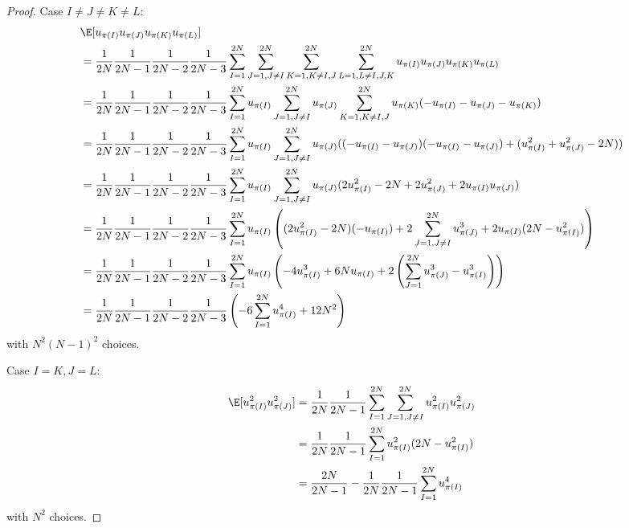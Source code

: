 \begin{proof}
  Case $I \neq J \neq K \neq L$: 
  \begin{align*}
    &\E[u_{\pi(I)} u_{\pi(J)} u_{\pi(K)} u_{\pi(L)}] \\
    &= \frac{1}{2N}\frac{1}{2N-1}\frac{1}{2N-2}\frac{1}{2N-3} 
    \sum_{I=1}^{2N} \sum_{J=1, J\neq I}^{2N} \sum_{K=1, K \neq I,J}^{2N} \sum_{L=1, L \neq I,J,K}^{2N} 
    u_{\pi(I)} u_{\pi(J)} u_{\pi(K)} u_{\pi(L)} \\
    &= \frac{1}{2N}\frac{1}{2N-1}\frac{1}{2N-2}\frac{1}{2N-3} 
    \sum_{I=1}^{2N} u_{\pi(I)} \sum_{J=1, J\neq I}^{2N} u_{\pi(J)} \sum_{K=1, K \neq
      I,J}^{2N} u_{\pi(K)} (-u_{\pi(I)}-u_{\pi(J)}-u_{\pi(K)}) \\
    &= \frac{1}{2N}\frac{1}{2N-1}\frac{1}{2N-2}\frac{1}{2N-3} 
    \sum_{I=1}^{2N} u_{\pi(I)} \sum_{J=1, J\neq I}^{2N} u_{\pi(J)} 
    ((-u_{\pi(I)}-u_{\pi(J)})(-u_{\pi(I)}-u_{\pi(J)})+(u_{\pi(I)}^2+u_{\pi(J)}^2-2N)) \\
    &= \frac{1}{2N}\frac{1}{2N-1}\frac{1}{2N-2}\frac{1}{2N-3} 
    \sum_{I=1}^{2N} u_{\pi(I)} \sum_{J=1, J\neq I}^{2N} u_{\pi(J)} 
    (2u_{\pi(I)}^2-2N+2u_{\pi(J)}^2+2u_{\pi(I)}u_{\pi(J)}) \\
    &= \frac{1}{2N}\frac{1}{2N-1}\frac{1}{2N-2}\frac{1}{2N-3} 
    \sum_{I=1}^{2N} u_{\pi(I)} \left ( 
      (2u_{\pi(I)}^2-2N)(-u_{\pi(I)})+2\sum_{J=1, J\neq I}^{2N} u_{\pi(J)}^3+2u_{\pi(I)}(2N-u_{\pi(I)}^2) 
    \right) \\
    &= \frac{1}{2N}\frac{1}{2N-1}\frac{1}{2N-2}\frac{1}{2N-3} 
    \sum_{I=1}^{2N} u_{\pi(I)} \left ( 
      -4u_{\pi(I)}^3 + 6Nu_{\pi(I)} + 2\left (\sum_{J=1}^{2N}u_{\pi(J)}^3 - u_{\pi(I)}^3 \right )
    \right) \\
    &= \frac{1}{2N}\frac{1}{2N-1}\frac{1}{2N-2}\frac{1}{2N-3} 
    \left ( -6\sum_{I=1}^{2N}u_{\pi(I)}^4+12N^2 \right )
  \end{align*}
  with $N^2(N-1)^2$ choices.
  
  Case $I=K, J=L$:
  \begin{align*}
    \E[u_{\pi(I)}^2 u_{\pi(J)}^2] &= \frac{1}{2N}\frac{1}{2N-1} \sum_{I=1}^{2N}
    \sum_{J=1, J\neq I}^{2N} u_{\pi(I)}^2 u_{\pi(J)}^2 \\
    &= \frac{1}{2N}\frac{1}{2N-1} \sum_{I=1}^{2N} u_{\pi(I)}^2 (2N - u_{\pi(I)}^2) \\
    &= \frac{2N}{2N-1}-\frac{1}{2N}\frac{1}{2N-1} \sum_{I=1}^{2N} u_{\pi(I)}^4
  \end{align*}
  with $N^2$ choices.


\end{proof}
